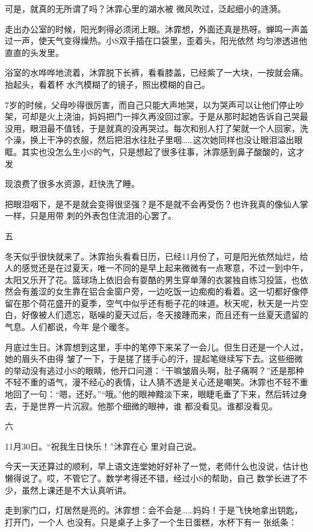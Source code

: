 \documentclass{article}
\begin{document}
\newpage

可是，就真的无所谓了吗？沐霏心里的湖水被
微风吹过，泛起细小的涟漪。 

走出办公室的时候，阳光刺得必须闭上眼。沐霏想，外面还真是热呀。蝉鸣一声盖过一声，使天气变得燥热。小S双手插在口袋里，歪着头，阳光依然
均匀渗透进他直直的头发里。 

浴室的水哗哗地流着，沐霏脱下长裤，看看膝盖，已经紫了一大块，一按就会痛。抬起头，看着杯
水汽模糊了的镜子，照出模糊的自己。 

7岁的时候，父母吵得很厉害，而自己只能大声地哭，以为哭声可以让他们停止吵架，可却是火上浇油，妈妈把门一摔久再没回过家。于是从那时起她告诉自己哭最没用，眼泪最不值钱，于是就真的没再哭过。每次和别人打了架就一个人回家，洗个澡，换上干净的衣服，然后把泪水往肚子里咽……这次她同样也没让眼泪溢出眼眶。其实也没怎么生小S的气，只是想起了很多往事，沐霏感到鼻子酸酸的，这才发

\newpage
现浪费了很多水资源，赶快洗了睡。 

把眼泪咽下，是不是就会变得很坚强？是不是就不会再受伤？也许我真的像仙人掌一样，只是用带
刺的外表包住流泪的心罢了。 


五 

冬天似乎很快就来了。沐霏抬头看看日历，已经11月份了，可是阳光依然灿烂，给人的感觉还是在过夏天，唯一不同的是早上起来微微有一点寒意，不过一到中午，太阳又乐开了花。篮球场上依旧会有耍酷的男生穿单薄的衣裳独自练习投篮，也依然会有羞涩的女生靠在铝合金窗户旁，一边吃饭一边痴痴的看着。这一切都好像停留在那个荷花盛开的夏季，空气中似乎还有栀子花的味道。秋天呢，秋天是一片空白，好像被人们遗忘，聒噪的夏天过后，冬天接踵而来，而且还有一丝夏天遗留的气息。人们都说，今年
是个暖冬。 

月底过生日。沐霏想到这里，手中的笔停下来呆了一会儿。但生日还是一个人过，她的眉头不由得
\newpage
皱了一下，于是搓了搓手心的汗，提起笔继续写下去。这些细微的举动没有逃过小S的眼睛，他开口问道：“干嘛皱眉头啊，肚子痛啊？”还是那种不轻不重的语气，漫不经心的表情，让人猜不透是关心还是嘲笑。沐霏也不轻不重地回了一句：“嗯，还好。”“哦。”他的眼神黯淡下来，眼睫毛垂了下来，然后转过身去，于是世界一片沉寂。他那个细微的眼神，谁
都没看见。谁都没看见。 


六 

11月30日。“祝我生日快乐！”沐霏在心
里对自己说。 

今天一天还算过的顺利，早上语文连堂她好好补了一觉，老师什么也没说，估计也懒得说了。哎，不管它了。数学考得还不错，经过小S的帮助，自己
数学长进了不少，虽然上课还是不大认真听讲。 

走到家门口，灯居然是亮的。沐霏想：会不会是……妈妈！于是飞快地拿出钥匙，打开门，一个人
\newpage
也没有。只是桌子上多了一个生日蛋糕，水杯下有一
张纸条： 
\end{document}
